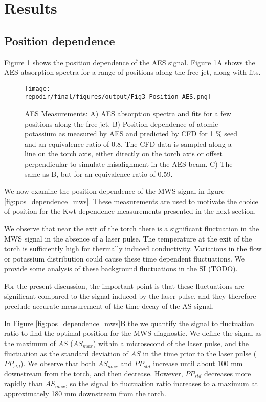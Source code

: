 

\section{Results}

\subsection{Position dependence}

Figure \ref{fig:pos_dependence_aes} shows the position dependence of the AES signal. Figure \ref{fig:pos_dependence_aes}A shows the AES absorption spectra for a range of positions along the free jet, along with fits. 

\begin{figure}[h]
    \texttt{[image: \\repodir/final/figures/output/Fig3\_Position\_AES.png]} 
    \caption{AES Measurements: A) AES absorption spectra and fits for a few positions along the free jet. B) Position dependence of atomic potassium as measured by AES and predicted by CFD for 1 \% seed and an equivalence ratio of 0.8. The CFD data is sampled along a line on the torch axis, either directly on the torch axis or offset perpendicular to simulate misalignment in the AES beam. C) The same as B, but for an equivalence ratio of 0.59. }
    \label{fig:pos_dependence_aes}
\end{figure}

We now examine the position dependence of the MWS signal in figure \ref{fig:pos_dependence_mws}.  These measurements are used to motivate the choice of position for the Kwt dependence measurements presented in the next section. 

We observe that near the exit of the torch there is a significant fluctuation in the MWS signal in the absence of a laser pulse. The temperature at the exit of the torch is sufficiently high for thermally induced conductivity. Variations in the flow or potassium distribution could cause these time dependent fluctuations. We provide some analysis of these background fluctuations in the SI (TODO).

For the present discussion, the important point is that these fluctuations are significant compared to the signal induced by the laser pulse, and they therefore preclude accurate measurement of the time decay of the AS signal. 

In Figure \ref{fig:pos_dependence_mws}B the we quantify the signal to fluctuation ratio to find the optimal position for the MWS diagnostic. We define the signal as the maximum of $AS$ ($AS_{max}$) within a microsecond of the laser pulse, and the fluctuation as the standard deviation of $AS$ in the time prior to the laser pulse ($PP_{std}$). We observe that both $AS_{max}$ and $PP_{std}$ increase until about 100 mm downstream from the torch, and then decrease. However, $PP_{std}$ decreases more rapidly than $AS_{max}$, so the signal to fluctuation ratio increases to a maximum at approximately 180 mm downstream from the torch. 



